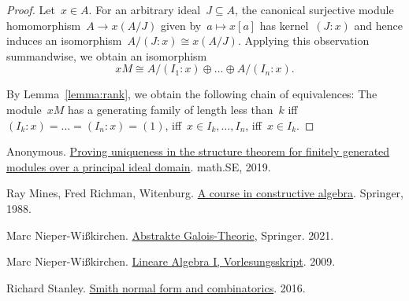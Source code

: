 \documentclass[12pt]{scrartcl}
\theoremstyle{definition}
\theoremstyle{plain}
\theoremstyle{remark}
\begin{document}
\begin{proof}
    Let~$x \in A$. For an arbitrary ideal~$J \subseteq A$, the canonical surjective module homomorphism~$A \to x(A/J)$ given by~$a \mapsto x[a]$ has kernel~$(J:x)$ and hence induces an isomorphism~$A/(J:x) \cong x(A/J)$. Applying this observation summandwise, we obtain an isomorphism
    \[ xM \cong A/(I_1:x) \oplus \ldots \oplus A/(I_n:x). \]

    By Lemma~\ref{lemma:rank}, we obtain the following chain of equivalences: The module~$xM$ has a generating family of length less than~$k$ iff~$(I_k:x) = \ldots = (I_n:x) = (1)$, iff~$x \in I_k,\ldots,I_n$, iff~$x \in I_k$.
\end{proof}

\begin{thebibliography}{9}
Anonymous. \href{https://math.stackexchange.com/a/3147043}{Proving uniqueness in the structure theorem for finitely generated modules over a principal ideal domain}. math.SE, 2019.

Ray Mines, Fred Richman, Witenburg. \href{https://link.springer.com/book/10.1007/978-1-4419-8640-5}{A course in constructive algebra}. Springer, 1988.

Marc Nieper-Wißkirchen. \href{https://link.springer.com/book/10.1007/978-3-662-63969-6}{Abstrakte Galois-Theorie}, Springer. 2021.

Marc Nieper-Wißkirchen. \href{https://assets.uni-augsburg.de/media/filer_public/3d/ae/3dae8efb-f1ab-49a9-a671-1cb2c855facc/lineare_algebra.pdf}{Lineare Algebra I, Vorlesungsskript}. 2009.

Richard Stanley. \href{https://math.mit.edu/~rstan/transparencies/alladi.pdf}{Smith normal form and combinatorics}. 2016.
\end{thebibliography}
\end{document}
